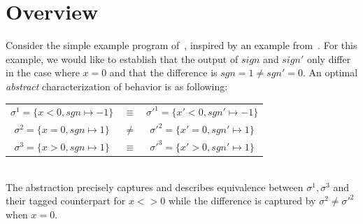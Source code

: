 \section{Overview}



Consider the simple example program of~, inspired by an example from~\cite{MauborgneRival07}. For this example, we would like to establish that the output of $sign$ and $sign'$ only differ in the case where $x=0$ and that the difference is $sgn = 1 \neq sgn' = 0$. An optimal \emph{abstract} characterization of behavior is as following:
\\
\begin{tabular}{ccc}
$\sigma^1 = \{x < 0, sgn \mapsto -1\}$ & $\equiv$ & $\sigma'^1 = \{x' < 0, sgn' \mapsto -1\}$
\\
$\sigma^2 = \{x = 0, sgn \mapsto 1\}$ & $\neq$ & $\sigma'^2 = \{x' = 0, sgn' \mapsto 1\}$
\\
$\sigma^3 = \{x > 0, sgn \mapsto 1\}$ & $\equiv$ & $\sigma'^3 = \{x' > 0, sgn' \mapsto 1\}$
\\
\end{tabular}
\\
The abstraction precisely captures and describes equivalence between $\sigma^1,\sigma^3$ and their tagged counterpart for $x <> 0$ while the difference is captured by $\sigma^2 \neq \sigma'^2$ when $x = 0$.

